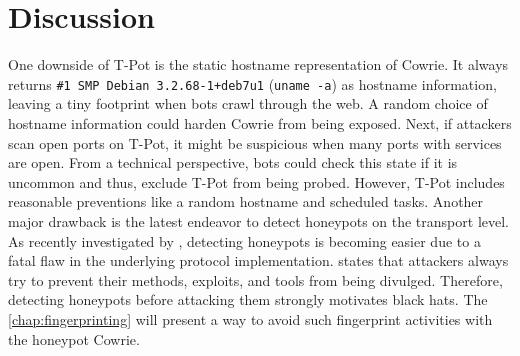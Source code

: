 \section{Discussion}

One downside of T-Pot is the static hostname representation of Cowrie.
It always returns \verb|#1 SMP Debian 3.2.68-1+deb7u1| (\verb|uname -a|) as hostname information, leaving a tiny footprint when bots crawl through the web.
A random choice of hostname information could harden Cowrie from being exposed.
Next, if attackers scan open ports on T-Pot, it might be suspicious when many ports with services are open.
From a technical perspective, bots could check this state if it is uncommon and thus, exclude T-Pot from being probed.
However, T-Pot includes reasonable preventions like a random hostname and scheduled tasks.
Another major drawback is the latest endeavor to detect honeypots on the transport level.
As recently investigated by \citet{vetterl2020}, detecting honeypots is becoming easier due to a fatal flaw in the underlying protocol implementation.
\citet{vetterl2020} states that attackers always try to prevent their methods, exploits, and tools from being divulged.
Therefore, detecting honeypots before attacking them strongly motivates black hats.
The \autoref{chap:fingerprinting} will present a way to avoid such fingerprint activities with the honeypot Cowrie.
